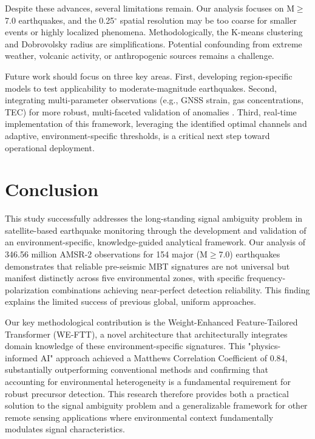 \documentclass[preprint,review,12pt,authoryear]{elsarticle}
\begin{document}
Despite these advances, several limitations remain. Our analysis focuses on M$\ge$7.0 earthquakes, and the 0.25$^{\circ}$ spatial resolution may be too coarse for smaller events or highly localized phenomena. Methodologically, the K-means clustering and Dobrovolsky radius are simplifications. Potential confounding from extreme weather, volcanic activity, or anthropogenic sources remains a challenge.

Future work should focus on three key areas. First, developing region-specific models to test applicability to moderate-magnitude earthquakes. Second, integrating multi-parameter observations (e.g., GNSS strain, gas concentrations, TEC) for more robust, multi-faceted validation of anomalies \citep{hayakawaIntegratedAnalysisMultiParameter2024}. Third, real-time implementation of this framework, leveraging the identified optimal channels and adaptive, environment-specific thresholds, is a critical next step toward operational deployment.


\section{Conclusion}

This study successfully addresses the long-standing signal ambiguity problem in satellite-based earthquake monitoring through the development and validation of an environment-specific, knowledge-guided analytical framework. Our analysis of 346.56 million AMSR-2 observations for 154 major (M$\ge$7.0) earthquakes demonstrates that reliable pre-seismic MBT signatures are not universal but manifest distinctly across five environmental zones, with specific frequency-polarization combinations achieving near-perfect detection reliability. This finding explains the limited success of previous global, uniform approaches.

Our key methodological contribution is the Weight-Enhanced Feature-Tailored Transformer (WE-FTT), a novel architecture that architecturally integrates domain knowledge of these environment-specific signatures. This "physics-informed AI" approach achieved a Matthews Correlation Coefficient of 0.84, substantially outperforming conventional methods and confirming that accounting for environmental heterogeneity is a fundamental requirement for robust precursor detection. This research therefore provides both a practical solution to the signal ambiguity problem and a generalizable framework for other remote sensing applications where environmental context fundamentally modulates signal characteristics.
\end{document}
